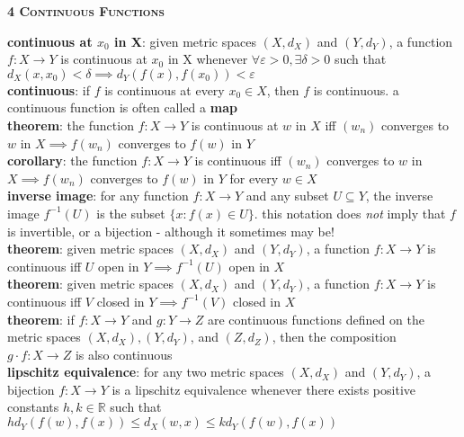 \documentclass[a4paper]{article}
\begin{document}
\begin{framed}
	\begin{center}
		\textbf{\textsc{4 Continuous Functions}}
	\end{center}
	\textbf{continuous at $x_0$ in X}: given metric spaces $(X, d_X)$ and $(Y, d_Y)$, a function $f: X \rightarrow Y$ is continuous at $x_0$ in X whenever $\forall \varepsilon > 0, \exists \delta > 0$ such that $d_X(x, x_0) < \delta \implies d_Y(f(x), f(x_0)) < \varepsilon$\\
	
	\noindent
	\textbf{continuous}: if $f$ is continuous at every $x_0 \in X$, then $f$ is continuous. a continuous function is often called a \textbf{map}\\
	
	\noindent
	\textbf{theorem}: the function $f: X \rightarrow Y$ is continuous at $w$ in $X$ iff $(w_n)$ converges to $w$ in $X \implies f(w_n)$ converges to $f(w)$ in $Y$\\
	
	\noindent
	\textbf{corollary}: the function $f: X \rightarrow Y$ is continuous iff $(w_n)$ converges to $w$ in $X \implies f(w_n)$ converges to $f(w)$ in $Y$ for every $w \in X$\\
	
	\noindent
	\textbf{inverse image}: for any function $f: X \rightarrow Y$ and any subset $U \subseteq Y$, the inverse image $f^{-1}(U)$ is the subset $\{ x : f(x) \in U \}$. this notation does \textit{not} imply that $f$ is invertible, or a bijection - although it sometimes may be!\\
	
	\noindent
	\textbf{theorem}: given metric spaces $(X, d_X)$ and $(Y, d_Y)$, a function $f: X \rightarrow Y$ is continuous iff $U$ open in $Y \implies f^{-1}(U)$ open in $X$\\
	
	\noindent
	\textbf{theorem}: given metric spaces $(X, d_X)$ and $(Y, d_Y)$, a function $f: X \rightarrow Y$ is continuous iff $V$ closed in $Y \implies f^{-1}(V)$ closed in $X$\\
	
	\noindent
	\textbf{theorem}: if $f: X \rightarrow Y$ and $g: Y \rightarrow Z$ are continuous functions defined on the metric spaces $(X, d_X), (Y, d_Y)$, and $(Z, d_Z)$, then the composition $g \cdot f: X \rightarrow Z$ is also continuous\\
	
	\noindent
	\textbf{lipschitz equivalence}: for any two metric spaces $(X, d_X)$ and $(Y, d_Y)$, a bijection $f: X \rightarrow Y$ is a lipschitz equivalence whenever there exists positive constants $h, k \in \mathbb{R}$ such that $hd_Y(f(w), f(x)) \leq d_X(w, x) \leq kd_Y(f(w), f(x))$\\
	

\end{framed}
\end{document}

